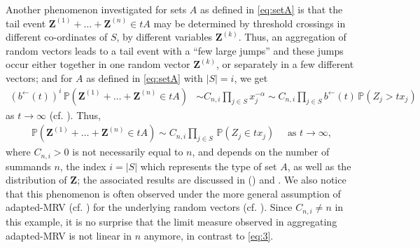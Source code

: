 \documentclass[aos]{imsart}
\numberwithin{equation}{section}
\theoremstyle{plain} %
\theoremstyle{remark}
\renewcommand\P{\mathbb{P}}
\def\bZ{\boldsymbol Z}
\begin{document}
{Another phenomenon  investigated  for sets $A$ as defined in \eqref{eq:setA} is that the tail event $\bZ^{(1)}+\ldots+\bZ^{(n)} \in tA$ may be determined by threshold crossings in different co-ordinates of $S$, by different variables $\bZ^{(k)}$. Thus, an aggregation of random vectors leads to a tail event with a ``few large jumps'' and these jumps occur either together in one random vector $\bZ^{(k)}$, or separately in a few different vectors; and  for $A$ as defined in \eqref{eq:setA} with $|S|=i$, we get
\begin{align*}
  (b^{\leftarrow}(t))^i \,\P(\bZ^{(1)} + \ldots + \bZ^{(n)} \in tA) & \sim C_{n,i} \prod_{j\in S} x_j^{-\alpha} \sim C_{n,i} \prod_{j\in S} b^{\leftarrow}(t) \,\P(Z_j > tx_j)  
\end{align*}
as $t\to\infty$ (cf. ). Thus,
\begin{align}\label{eq:nMRVgeneral2}
\P(\bZ^{(1)} + \ldots + \bZ^{(n)} \in tA)  \sim C_{n,i} \prod_{j\in S}\,\P(Z_{j}\in tx_j) \quad \text{ as } t\to\infty,
\end{align}
where $C_{n,i}>0$ is not necessarily equal to $n$, and depends on the number of summands $n$, the index $i=|S|$ which represents the type of set $A$, as well as the distribution of $\bZ$; the associated results are discussed  in  () and . We also notice that this phenomenon is often observed under the more general assumption of adapted-MRV (cf. ) for the underlying random vectors (cf. }). {Since $C_{n,i}\not=n$ in this example, it is no surprise that the limit measure observed in aggregating adapted-MRV is not linear in $n$ anymore, in contrast to \eqref{eq:3}.}
\end{document}
